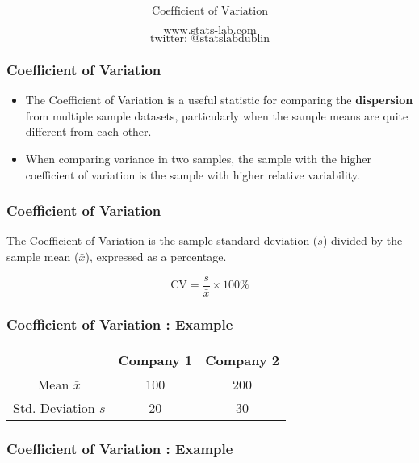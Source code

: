\documentclass{beamer}
\begin{document}
\begin{frame}

{
\Huge
\[\mbox{Coefficient of Variation} \]
}
{
\Large

\[\mbox{www.stats-lab.com} \]
\[ \mbox{twitter: @statslabdublin} \] 

}
\end{frame}


\begin{frame}
\frametitle{Coefficient of Variation}
\LARGE
\vspace{-1cm}
\begin{itemize}
\item The Coefficient of Variation is a useful statistic for comparing the \textbf{dispersion} from multiple sample datasets, particularly when the sample means are quite different from each other.
\item
When comparing variance in two samples, the sample with the higher coefficient of variation is the sample with higher relative variability.
\end{itemize}
\end{frame}
\begin{frame}
\frametitle{Coefficient of Variation}
\LARGE
\vspace{-1cm}
The Coefficient of Variation is the sample standard deviation ($s$) divided by the sample mean ($\bar{x}$), expressed as a percentage.

\[ \mbox{CV}  = \frac{s}{\bar{x}}  \times 100 \% \]
\end{frame}
\begin{frame}
\frametitle{Coefficient of Variation : Example}
\LARGE
\vspace{-2.5cm}
\begin{center}
\begin{tabular}{|c|c|c|}
\hline  & Company 1 & Company 2  \\ 
\hline Mean $\bar{x}$ & 100 & 200 \\ 
\hline Std. Deviation $s$& 20 & 30  \\ 
\hline 
\end{tabular} 
\end{center}
\end{frame}
\begin{frame}
\frametitle{Coefficient of Variation : Example}
\end{frame}
\end{document}
